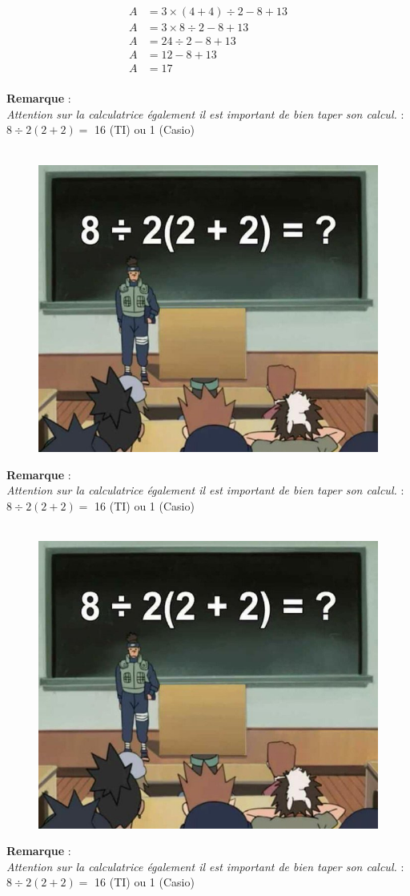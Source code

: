 \documentclass[11pt]{article}
\begin{document}
\begin{align*}
  A &= 3 \times (4 + 4) \div 2 - 8 + 13 \\
  A &= 3 \times 8 \div 2 - 8 + 13\\
  A &= 24 \div 2 - 8 + 13 \\
  A &= 12 - 8  + 13\\
  A &= 17 \\
\end{align*}


\textbf{Remarque} : \\
\textit{Attention sur la calculatrice également il est important de bien taper son calcul. } : $8 \div 2(2+2) =$ 16 (TI) ou 1 (Casio)

\begin{figure}[H]
      \centering
      \includegraphics[width=0.4\linewidth]{5x1-calculer/naruto.png}
\end{figure}


\newpage

\textbf{Remarque} : \\
\textit{Attention sur la calculatrice également il est important de bien taper son calcul. } : $8 \div 2(2+2) =$ 16 (TI) ou 1 (Casio)


  \begin{figure}[H]
        \centering
        \includegraphics[width=0.4\linewidth]{5x1-calculer/naruto.png}
  \end{figure}




\textbf{Remarque} : \\
\textit{Attention sur la calculatrice également il est important de bien taper son calcul. } : $8 \div 2(2+2) =$ 16 (TI) ou 1 (Casio)
\end{document}
